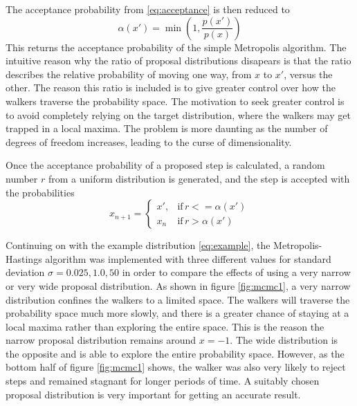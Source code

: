 The acceptance probability from \ref{eq:acceptance} is then reduced to
\begin{equation}
  \alpha(x') = \min \left( 1, \frac{p(x')}{p(x)} \right)
\end{equation}
This returns the acceptance probability of the simple Metropolis algorithm. The
intuitive reason why the ratio of proposal distributions disapears is that the
ratio describes the relative probability of moving one way, from $x$ to $x'$,
versus the other. The reason this ratio is included is to give greater control
over how the walkers traverse the probability space. The motivation to seek
greater control is to avoid completely relying on the target distribution, where
the walkers may get trapped in a local maxima. The problem is more daunting as
the number of degrees of freedom increases, leading to the curse of
dimensionality.

Once the acceptance probability of a proposed step is calculated, a random
number $r$ from a uniform distribution is generated, and the step is accepted
with the probabilities
\begin{equation}
  x_{n+1} = \left\{
    \begin{array}{lr}
      x', & \text{if} \, r <= \alpha(x') \\
      x_n & \text{if} \, r > \alpha(x')
    \end{array}
  \right.
\end{equation}

Continuing on with the example distribution \ref{eq:example}, the
Metropolis-Hastings algorithm was implemented with three different values for
standard deviation $\sigma = 0.025, 1.0, 50$ in order to compare the effects of
using a very narrow or very wide proposal distribution. As shown in figure
\ref{fig:mcmc1}, a very narrow distribution confines the walkers to a limited
space. The walkers will traverse the probability space much more slowly, and
there is a greater chance of staying at a local maxima rather than exploring the
entire space. This is the reason the narrow proposal distribution remains around
$x = -1$. The wide distribution is the opposite and is able to explore the
entire probability space. However, as the bottom half of figure \ref{fig:mcmc1}
shows, the walker was also very likely to reject steps and remained stagnant for
longer periods of time. A suitably chosen proposal distribution is very
important for getting an accurate result.


